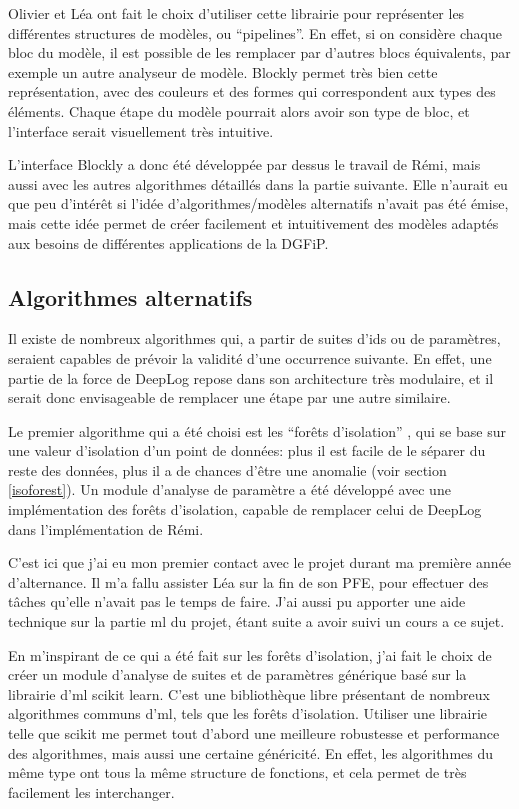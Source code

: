 \documentclass[openany, 11pt]{memoir}
\begin{document}
\bigskip
Olivier et Léa ont fait le choix d'utiliser cette librairie pour représenter les différentes structures de modèles, ou ``pipelines''. En effet, si on considère chaque bloc du modèle, il est possible de les remplacer par d'autres blocs équivalents, par exemple un autre analyseur de modèle. Blockly permet très bien cette représentation, avec des couleurs et des formes qui correspondent aux types des éléments. Chaque étape du modèle pourrait alors avoir son type de bloc, et l'interface serait visuellement très intuitive.

L'interface Blockly a donc été développée par dessus le travail de Rémi, mais aussi avec les autres algorithmes détaillés dans la partie suivante. Elle n'aurait eu que peu d'intérêt si l'idée d'algorithmes/modèles alternatifs n'avait pas été émise, mais cette idée permet de créer facilement et intuitivement des modèles adaptés aux besoins de différentes applications de la DGFiP.

\subsection{Algorithmes alternatifs}

Il existe de nombreux algorithmes qui, a partir de suites d'ids ou de paramètres, seraient capables de prévoir la validité d'une occurrence suivante. En effet, une partie de la force de DeepLog repose dans son architecture très modulaire, et il serait donc envisageable de remplacer une étape par une autre similaire.

Le premier algorithme qui a été choisi est les ``forêts d'isolation'' \cite{isolationforest}, qui se base sur une valeur d'isolation d'un point de données: plus il est facile de le séparer du reste des données, plus il a de chances d'être une anomalie (voir section \ref{isoforest}). Un module d'analyse de paramètre a été développé avec une implémentation des forêts d'isolation, capable de remplacer celui de DeepLog dans l'implémentation de Rémi.

\bigskip
C'est ici que j'ai eu mon premier contact avec le projet durant ma première année d'alternance. Il m'a fallu assister Léa sur la fin de son PFE, pour effectuer des tâches qu'elle n'avait pas le temps de faire. J'ai aussi pu apporter une aide technique sur la partie \gls{ml} du projet, étant suite a avoir suivi un cours a ce sujet.

En m'inspirant de ce qui a été fait sur les forêts d'isolation, j'ai fait le choix de créer un module d'analyse de suites et de paramètres générique basé sur la librairie d'\gls{ml} scikit learn. C'est une bibliothèque libre présentant de nombreux algorithmes communs d'\gls{ml}, tels que les forêts d'isolation. Utiliser une librairie telle que scikit me permet tout d'abord une meilleure robustesse et performance des algorithmes, mais aussi une certaine généricité. En effet, les algorithmes du même type ont tous la même structure de fonctions, et cela permet de très facilement les interchanger.
\end{document}
